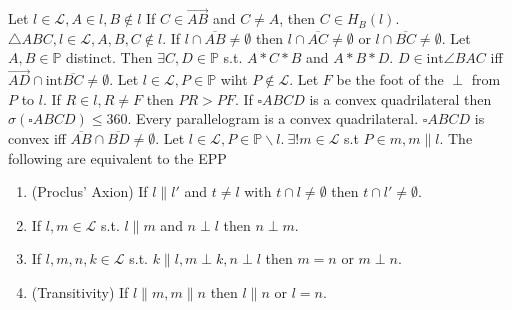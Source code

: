 \documentclass[12pt]{article}
\theoremstyle{lowspace}
\newenvironment{customthm}[1]
  {\renewcommand\theinnercustomthm{#1}\innercustomthm}
  {\endinnercustomthm}
\theoremstyle{lowspace}
\newenvironment{customdef}[1]
  {\renewcommand\theinnercustomdef{#1}\innercustomdef}
  {\endinnercustomdef}
\theoremstyle{lowspace}
\newenvironment{customlemma}[1]
  {\renewcommand\theinnercustomlemma{#1}\innercustomlemma}
  {\endinnercustomlemma}
\newcommand{\inta}{
  \mathrm{int}
}
\begin{document}
    \begin{customthm}{3.3.9 (Ray Theorem)}
        Let $l \in \mathscr{L}, A \in l, B \notin l$ If $C \in \overrightarrow{AB}$ 
        and $C \neq A$, then $C \in H_B(l)$.
    \end{customthm}
    \begin{customthm}{3.3.12 (Pasch's Axiom)}
      $\triangle{ABC}, l \in \mathscr{L}, A,B,C \notin l$. If $l \cap \overline{AB}
      \neq \emptyset$ then $l \cap \overline{AC} \neq \emptyset$ or $l \cap \overline{BC} \neq \emptyset$.
    \end{customthm}
    \begin{customlemma}{3.5.0}
      Let $A,B \in \mathbb{P}$ distinct. Then $\exists C,D \in \mathbb{P}$ s.t. $A*C*B$ and $A*B*D$.
    \end{customlemma}
    \begin{customthm}{3.5.3}
      $D \in \inta\angle{BAC}$ iff $\overrightarrow{AD} \cap \inta\overline{BC} \neq \emptyset$.
    \end{customthm}
    \begin{customthm}{4.3.4}
      Let $l \in \mathscr{L}, P \in \mathbb{P}$ wiht $P \notin \mathscr{L}$. Let $F$ be the foot of the $\perp$ from $P$ to $l$. If $R \in l, R \neq F$ then $PR > PF$.
    \end{customthm}
    \begin{customthm}{4.6.4}
      If $\square ABCD$ is a convex quadrilateral then $\sigma(\square ABCD) \leq 360$.
    \end{customthm}
    \begin{customthm}{4.6.6}
      Every parallelogram is a convex quadrilateral. 
    \end{customthm}
    \begin{customthm}{4.6.8}
      $\square ABCD$ is convex iff $\overline{AB} \cap \overline{BD} \neq \emptyset$.
    \end{customthm}
    \begin{customdef}{EPP}
      Let $l \in \mathscr{L}, P \in \mathbb{P}\backslash l. \ \exists !m \in \mathscr{L}$ 
      s.t $P \in m, m \parallel l$.
    \end{customdef}
    \begin{customthm}{4.7.3}
      The following are equivalent to the EPP
      \begin{enumerate}
        \item (Proclus' Axion) If $l \parallel l'$ and $t\neq l$ with $t \cap l \neq \emptyset$ then $t \cap l' \neq \emptyset$.
        \item If $l,m \in \mathscr{L}$ s.t. $l \parallel m$ and $n \perp l$ then $n \perp m$.
        \item If $l,m,n,k \in \mathscr{L}$ s.t. $k \parallel l, m \perp k, n \perp l$ then $m=n$ or $m \perp n$.
        \item (Transitivity) If $l \parallel m, m \parallel n$ then $l \parallel n$ or $l=n$.
      \end{enumerate}
    \end{customthm}
\end{document}
